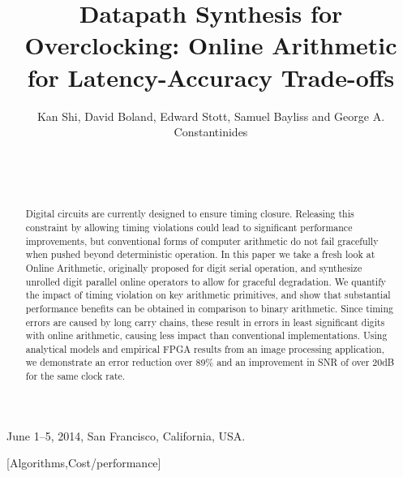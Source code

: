 \documentclass{acm_proc_article-sp}
\begin{document}
\title{Datapath Synthesis for Overclocking: Online Arithmetic for Latency-Accuracy Trade-offs}

%
\author{
\alignauthor
Kan Shi, David Boland, Edward Stott, Samuel Bayliss and George A. Constantinides\\
       \\
       \\
       \\
}

 {June 1--5, 2014, San Francisco, California, USA.}

\maketitle

\begin{abstract}
Digital circuits are currently designed to ensure timing closure. Releasing this constraint by allowing timing violations could lead to significant performance improvements, but conventional forms of computer arithmetic do not fail gracefully when pushed beyond deterministic operation. In this paper we take a fresh look at Online Arithmetic, originally proposed for digit serial operation, and synthesize unrolled digit parallel online operators to allow for graceful degradation. We quantify the impact of timing violation on key arithmetic primitives, and show that substantial performance benefits can be obtained in comparison to binary arithmetic. Since timing errors are caused by long carry chains, these result in errors in least significant digits with online arithmetic, causing less impact than conventional implementations. Using analytical models and empirical FPGA results from an image processing application, we demonstrate an error reduction over 89\% and an improvement in SNR of over 20dB for the same clock rate.
\end{abstract}
%
[Algorithms,Cost/performance]
\end{document}
